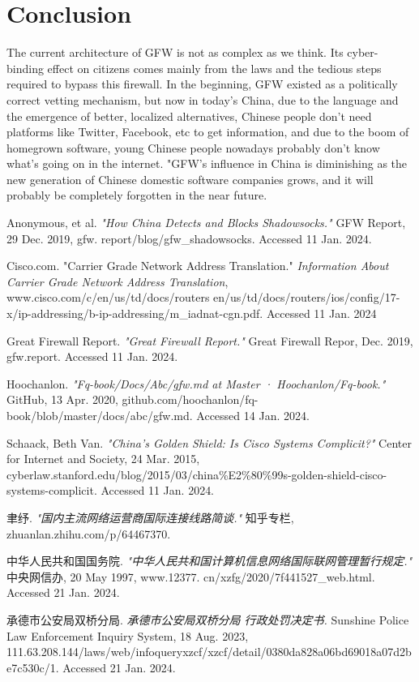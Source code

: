 \documentclass[11pt]{article}
\begin{document}
\section{Conclusion}
The current architecture of GFW is not as complex as we think. Its cyber-binding
effect on citizens comes mainly from the laws and the tedious steps required to
bypass this firewall. In the beginning, GFW existed as a politically correct
vetting mechanism, but now in today's China, due to the language and the
emergence of better, localized alternatives, Chinese people don't need platforms
like Twitter, Facebook, etc to get information, and due to the boom of
homegrown software, young Chinese people nowadays probably don't know what's
going on in the internet. "GFW's influence in China is diminishing as the new
generation of Chinese domestic software companies grows, and it will probably be
completely forgotten in the near future.
\newpage

\begin{thebibliography}{9}
	 Anonymous, et al. \textit{"How China Detects
		and Blocks Shadowsocks."} GFW Report, 29 Dec. 2019, gfw.
	report/blog/gfw\_shadowsocks. Accessed 11 Jan. 2024.

	 Cisco.com. "Carrier Grade Network Address Translation."
	\textit{Information About Carrier Grade Network Address Translation}, www.cisco.com/c/en/us/td/docs/routers
	en/us/td/docs/routers/ios/config/17-x/ip-addressing/b-ip-addressing/m\_iadnat-cgn.pdf. Accessed 11 Jan. 2024

	 Great Firewall Report. \textit{"Great Firewall Report."}
	Great Firewall Repor, Dec. 2019, gfw.report. Accessed 11 Jan. 2024.

	 Hoochanlon. \textit{"Fq-book/Docs/Abc/gfw.md at Master ·
		Hoochanlon/Fq-book."} GitHub, 13 Apr. 2020, github.com/hoochanlon/fq-book/blob/master/docs/abc/gfw.md. Accessed 14 Jan. 2024.

	Schaack, Beth Van. \textit{"China's Golden Shield: Is Cisco Systems Complicit?"} Center
	for Internet and Society, 24 Mar. 2015, cyberlaw.stanford.edu/blog/2015/03/china\%E2\%80\%99s-golden-shield-cisco-systems-complicit.
	Accessed 11 Jan. 2024.

	聿纾. \textit{"国内主流网络运营商国际连接线路简谈."} 知乎专栏, zhuanlan.zhihu.com/p/64467370.

	中华人民共和国国务院. \textit{"中华人民共和国计算机信息网络国际联网管理暂行规定."} 中央网信办, 20 May 1997, www.12377.
	cn/xzfg/2020/7f441527\_web.html. Accessed 21 Jan. 2024.

	承德市公安局双桥分局. \textit{承德市公安局双桥分局 行政处罚决定书.} Sunshine Police Law Enforcement Inquiry
	System, 18 Aug. 2023, 111.63.208.144/laws/web/infoqueryxzcf/xzcf/detail/0380da828a06bd69018a07d2be7c530c/1.
	Accessed 21 Jan. 2024.
\end{thebibliography}
\end{document}
